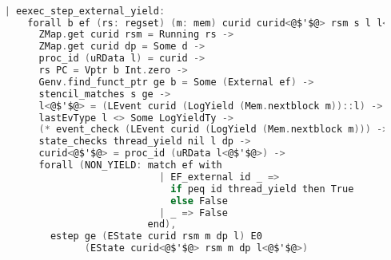 \begin{lstlisting}[language=C]

    | eexec_step_external_yield:
        forall b ef (rs: regset) (m: mem) curid curid<@$'$@> rsm s l l<@$'$@> dp d,
          ZMap.get curid rsm = Running rs ->
          ZMap.get curid dp = Some d ->
          proc_id (uRData l) = curid ->
          rs PC = Vptr b Int.zero ->
          Genv.find_funct_ptr ge b = Some (External ef) ->
          stencil_matches s ge ->
          l<@$'$@> = (LEvent curid (LogYield (Mem.nextblock m))::l) ->
          lastEvType l <> Some LogYieldTy ->
          (* event_check (LEvent curid (LogYield (Mem.nextblock m))) -> *)
          state_checks thread_yield nil l dp ->
          curid<@$'$@> = proc_id (uRData l<@$'$@>) ->
          forall (NON_YIELD: match ef with
                               | EF_external id _ => 
                                 if peq id thread_yield then True
                                 else False
                               | _ => False
                             end),
            estep ge (EState curid rsm m dp l) E0
                  (EState curid<@$'$@> rsm m dp l<@$'$@>)
\end{lstlisting}
%



